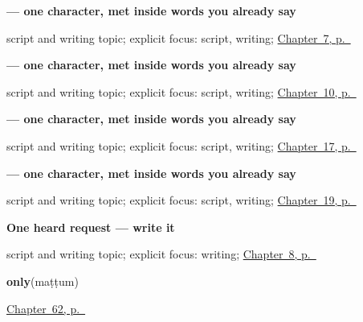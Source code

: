 \noindent\begin{minipage}[t]{\linewidth}
\raggedright
\textbf{ — one character, met inside words you already say}\par
\footnotesize script and writing topic; explicit focus: script, writing; \hyperref[ch:ta-numbers-one-to-ten]{Chapter~7, p.~\pageref*{ch:ta-numbers-one-to-ten}}
\end{minipage}\par\smallskip

\noindent\begin{minipage}[t]{\linewidth}
\raggedright
\textbf{ — one character, met inside words you already say}\par
\footnotesize script and writing topic; explicit focus: script, writing; \hyperref[ch:ta-days-of-the-week]{Chapter~10, p.~\pageref*{ch:ta-days-of-the-week}}
\end{minipage}\par\smallskip

\noindent\begin{minipage}[t]{\linewidth}
\raggedright
\textbf{ — one character, met inside words you already say}\par
\footnotesize script and writing topic; explicit focus: script, writing; \hyperref[ch:ta-noon-and-midnight]{Chapter~17, p.~\pageref*{ch:ta-noon-and-midnight}}
\end{minipage}\par\smallskip

\noindent\begin{minipage}[t]{\linewidth}
\raggedright
\textbf{ — one character, met inside words you already say}\par
\footnotesize script and writing topic; explicit focus: script, writing; \hyperref[ch:ta-asking-age]{Chapter~19, p.~\pageref*{ch:ta-asking-age}}
\end{minipage}\par\smallskip

\noindent\begin{minipage}[t]{\linewidth}
\raggedright
\textbf{One heard request — write it}\par
\footnotesize script and writing topic; explicit focus: writing; \hyperref[ch:ta-please]{Chapter~8, p.~\pageref*{ch:ta-please}}
\end{minipage}\par\smallskip

\noindent\begin{minipage}[t]{\linewidth}
\raggedright
\textbf{only}\enspace\emph{}\enspace(maṭṭum)\par
\footnotesize \hyperref[ch:ta-only-and-still]{Chapter~62, p.~\pageref*{ch:ta-only-and-still}}
\end{minipage}\par\smallskip

